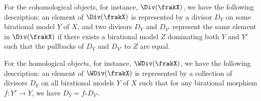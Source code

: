   For the cohomological objects, for instance, $\Div(\frakX)$, we have the following description:
  an element of $\Div(\frakX)$ is represented by a divisor $D_Y$ on some birational model $Y$ of $X$, and two divisors $D_Y$ and $D_{Y'}$ represent the same element in $\Div(\frakX)$ if there exists a birational model $Z$ dominating both $Y$ and $Y'$ such that the pullbacks of $D_Y$ and $D_{Y'}$ to $Z$ are equal.

  For the homological objects, for instance, $\WDiv(\frakX)$, we have the following description:
  an element of $\WDiv(\frakX)$ is represented by a collection of divisors $D_Y$ on all birational models $Y$ of $X$ such that for any birational morphism $f: Y' \to Y$, we have $D_{Y} = f_* D_{Y'}$.








